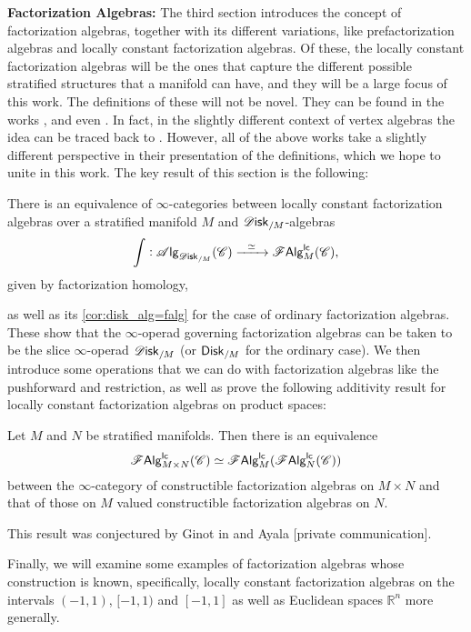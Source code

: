 \documentclass[../text]{subfiles}
\begin{document}
\textbf{ Factorization Algebras:} The third section introduces the concept of factorization algebras, together with its different variations, like prefactorization algebras and locally constant factorization algebras. Of these, the locally constant factorization algebras will be the ones that capture the different possible stratified structures that a manifold can have, and they will be a large focus of this work. The definitions of these will not be novel. They can be found in the works \cite{cg2016}, \cite{ginot2015} and even \cite{af_primer}. In fact, in the slightly different context of vertex algebras the idea can be traced back to \cite{bd2004}. However, all of the above works take a slightly different perspective in their presentation of the definitions, which we hope to unite in this work. The key result of this section is the following:
%
\begin{theorem*}[\ref{thm:disk_alg=lcfa}]
    There is an equivalence of $\infty$-categories between locally constant factorization algebras over a stratified manifold $M$ and $\disk_{/M}$-algebras
    \begin{equation}
        \int: \alg{\disk_{/M}} (\catC) \xrightarrow{\ \ \simeq \ \ } \lcfa_M (\catC),
    \end{equation}
    given by factorization homology,
\end{theorem*}
%
as well as its \cref{cor:disk_alg=falg} for the case of ordinary factorization algebras. These show that the $\infty$-operad governing factorization algebras can be taken to be the slice $\infty$-operad $\disk_{/M}$ (or $\disk[r]_{/M}$ for the ordinary case). We then introduce some operations that we can do with factorization algebras like the pushforward and restriction, as well as prove the following additivity result for locally constant factorization algebras on product spaces:
\begin{theorem*}[\ref{prop:exp_of_products_lc}]
    Let $M$ and $N$ be stratified manifolds. Then there is an equivalence
    \[
        \mathscr{F} \mathsf{Alg}^{\mathsf{lc}}_{M \times N}(\mathscr{C}) \simeq \mathscr{F} \mathsf{Alg}^{\mathsf{lc}}_{M}(\mathscr{F} \mathsf{Alg}^{\mathsf{lc}}_{N}(\mathscr{C}))
    \]
    between the $\infty$-category of constructible factorization algebras on $M\times N$ and that of those on $M$ valued constructible factorization algebras on $N$.
\end{theorem*}
This result was conjectured by Ginot in \cite{ginot2015} and Ayala [private communication].

Finally, we will examine some examples of factorization algebras whose construction is known, specifically, locally constant factorization algebras on the intervals $(-1,1)$, $[-1,1)$ and $[-1,1]$ as well as Euclidean spaces $\mathbb{R}^n$ more generally.
\end{document}
